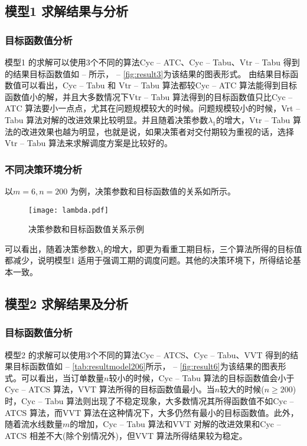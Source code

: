 \subsection{模型1 求解结果与分析}
\subsubsection{目标函数值分析}
模型1 的求解可以使用3个不同的算法Cyc -- ATC、Cyc -- Tabu、Vtr -- Tabu 得到的结果目标函数值如 -- 所示， -- \ref{fig:result3}为该结果的图表形式。
由结果目标函数值可以看出，Cyc -- Tabu 和 Vtr -- Tabu 算法都较Cyc -- ATC 算法能得到目标函数值小的解，并且大多数情况下Vtr -- Tabu 算法得到的目标函数值只比Cyc -- ATC 算法要小一点点，尤其在问题规模较大的时候。问题规模较小的时候，Vrt -- Tabu 算法对解的改进效果比较明显。并且随着决策参数$\lambda_1$的增大，Vtr -- Tabu 算法的改进效果也越为明显，也就是说，如果决策者对交付期较为重视的话，选择Vtr -- Tabu 算法来求解调度方案是比较好的。
\subsubsection{不同决策环境分析}
以$m = 6, n = 200$ 为例，决策参数和目标函数值的关系如所示。
\begin{figure}
\centering
\texttt{[image: lambda.pdf]}
\caption{决策参数和目标函数值关系示例}\label{fig:decisionvsG}
\end{figure}
可以看出，随着决策参数$\lambda_1$的增大，即更为看重工期目标，三个算法所得的目标值都减少，说明模型1 适用于强调工期的调度问题。其他的决策环境下，所得结论基本一致。
\subsection{模型2 求解结果及分析}
\subsubsection{目标函数值分析}
模型2 的求解可以使用3个不同的算法Cyc -- ATCS、Cyc -- Tabu、VVT 得到的结果目标函数值如 -- \ref{tab:resultmodel206}所示， -- \ref{fig:result6}为该结果的图表形式。可以看出，当订单数量$n$较小的时候，Cyc -- Tabu 算法的目标函数值会小于Cyc -- ATCS 算法，VVT 算法所得的目标函数值最小。当$n$较大的时候($n \ge 200$)时，Cyc -- Tabu 算法则出现了不稳定现象，大多数情况其所得函数值不如Cyc -- ATCS 算法，而VVT 算法在这种情况下，大多仍然有最小的目标函数值。此外，随着流水线数量$m$的增加，Cyc -- Tabu 算法和VVT 对解的改进效果和Cyc -- ATCS 相差不大(除个别情况外)，但VVT 算法所得结果较为稳定。

